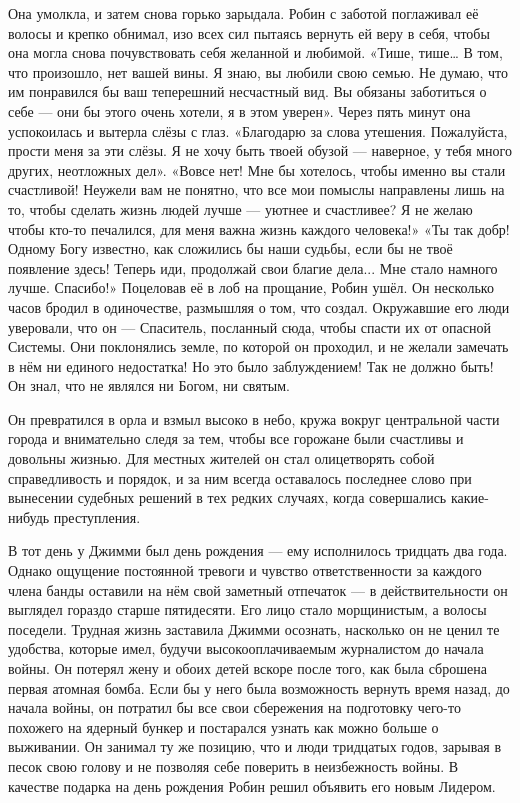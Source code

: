 \documentclass[a4paper,12pt]{book}
\begin{document}
	Она умолкла, и затем снова горько зарыдала.
	Робин с заботой поглаживал её волосы и крепко обнимал, изо всех сил пытаясь вернуть ей веру в себя, чтобы она могла снова почувствовать себя желанной и любимой.
	«Тише, тише… В том, что произошло, нет  вашей вины. Я знаю, вы любили свою семью. Не думаю, что им понравился бы ваш теперешний несчастный вид. Вы обязаны заботиться о себе — они бы этого очень хотели, я в этом уверен».
	Через пять минут она успокоилась и вытерла слёзы с глаз.
«Благодарю за слова утешения. Пожалуйста, прости меня за эти слёзы. Я не хочу быть твоей обузой — наверное, у тебя много других, неотложных дел».
	«Вовсе нет! Мне бы хотелось, чтобы именно вы стали счастливой! Неужели вам не понятно, что все мои помыслы направлены лишь на то, чтобы сделать жизнь людей лучше — уютнее и счастливее? Я не желаю чтобы кто-то печалился, для меня важна жизнь каждого человека!»
	«Ты так добр! Одному Богу известно, как сложились бы наши судьбы, если бы не твоё появление здесь! Теперь иди, продолжай свои благие дела... Мне стало намного лучше. Спасибо!»
	Поцеловав её в лоб на прощание, Робин ушёл.
	Он несколько часов бродил в одиночестве, размышляя о том, что создал. Окружавшие его люди уверовали, что он — Спаситель, посланный сюда, чтобы спасти их от опасной Системы. Они поклонялись земле, по которой он проходил, и не желали замечать в нём ни единого недостатка! Но это было заблуждением! Так не должно быть! Он знал, что не являлся ни Богом, ни святым.

	Он превратился в орла и взмыл высоко в небо, кружа вокруг центральной части города и внимательно следя за тем, чтобы все горожане были счастливы и довольны жизнью. Для местных жителей он стал олицетворять собой справедливость и порядок, и за ним всегда оставалось последнее слово при вынесении судебных решений в тех редких случаях, когда совершались какие-нибудь преступления.

	В тот день у Джимми был день рождения — ему исполнилось тридцать два года. Однако ощущение постоянной тревоги и чувство ответственности за каждого члена банды оставили на нём свой заметный отпечаток — в действительности он выглядел гораздо старше пятидесяти. Его лицо стало морщинистым, а волосы поседели.
	Трудная жизнь заставила Джимми осознать, насколько он не ценил те удобства, которые имел, будучи высокооплачиваемым журналистом до начала войны. Он потерял жену и обоих детей вскоре после того, как была сброшена первая атомная бомба. Если бы у него была возможность вернуть время назад, до начала войны, он потратил бы все свои сбережения на подготовку чего-то похожего на ядерный бункер и постарался узнать как можно больше о выживании. Он занимал ту же позицию, что и люди тридцатых годов, зарывая в песок свою голову и не позволяя себе поверить в неизбежность войны.
	В качестве подарка на день рождения Робин решил объявить его новым Лидером.
\end{document}
